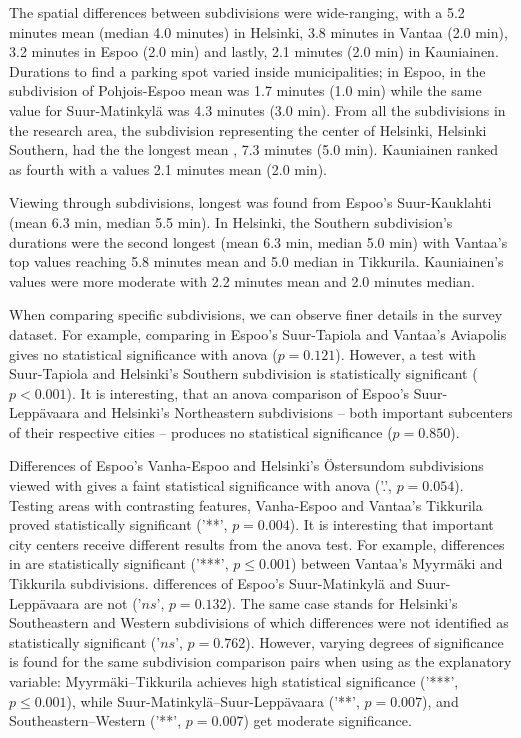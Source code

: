 The spatial differences between subdivisions were wide-ranging, with a 5.2 minutes mean (median 4.0 minutes)  in Helsinki, 3.8 minutes in Vantaa (2.0 min), 3.2 minutes in Espoo (2.0 min) and lastly, 2.1 minutes (2.0 min) in Kauniainen. Durations to find a parking spot varied inside municipalities; in Espoo, in the subdivision of Pohjois-Espoo mean  was 1.7 minutes (1.0 min) while the same value for Suur-Matinkylä was 4.3 minutes (3.0 min). From all the subdivisions in the research area, the subdivision representing the center of Helsinki, Helsinki Southern, had the the longest mean , 7.3 minutes (5.0 min). Kauniainen ranked as fourth with a  values 2.1 minutes mean (2.0 min).

Viewing  through subdivisions, longest  was found from Espoo's Suur-Kauklahti (mean 6.3 min, median 5.5 min). In Helsinki, the Southern subdivision's durations were the second longest (mean 6.3 min, median 5.0 min) with Vantaa's top values reaching 5.8 minutes mean and 5.0 median in Tikkurila. Kauniainen's  values were more moderate with 2.2 minutes mean and 2.0 minutes median.

When comparing specific subdivisions, we can observe finer details in the survey dataset. For example, comparing  in Espoo's Suur-Tapiola and Vantaa's Aviapolis gives no statistical significance with \acrshort{anova} ($p = 0.121$). However, a test with Suur-Tapiola and Helsinki's Southern subdivision is statistically significant ($p < 0.001$). It is interesting, that an \acrshort{anova}  comparison of Espoo's Suur-Leppävaara and Helsinki's Northeastern subdivisions -- both important subcenters of their respective cities -- produces no statistical significance ($p = 0.850$). 

Differences of Espoo's Vanha-Espoo and Helsinki's Östersundom subdivisions viewed with  gives a faint statistical significance with \acrshort{anova} ('.', $p = 0.054$). Testing areas with contrasting features, Vanha-Espoo and Vantaa's Tikkurila proved statistically significant ('**', $p = 0.004$). It is interesting that important city centers receive different results from the \acrshort{anova} test. For example, differences in  are statistically significant (’***’, $p \leq 0.001$) between Vantaa's Myyrmäki and Tikkurila subdivisions.  differences of Espoo's Suur-Matinkylä and Suur-Leppävaara are not ('$ns$', $p = 0.132$). The same case stands for Helsinki's Southeastern and Western subdivisions of which differences were not identified as statistically significant ('$ns$', $p = 0.762$). However, varying degrees of significance is found for the same subdivision comparison pairs when using  as the explanatory variable: Myyrmäki--Tikkurila achieves high statistical significance (’***’, $p \leq 0.001$), while Suur-Matinkylä--Suur-Leppävaara ('**', $p = 0.007$), and Southeastern--Western ('**', $p = 0.007$) get moderate significance.


